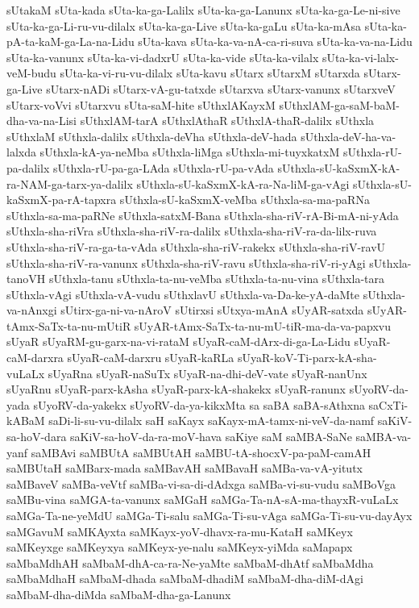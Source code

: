 {sUtakaM
sUta-kada
sUta-ka-ga-Lalilx
sUta-ka-ga-Lanunx
sUta-ka-ga-Le-ni-sive
sUta-ka-ga-Li-ru-vu-dilalx
sUta-ka-ga-Live
sUta-ka-gaLu
sUta-ka-mAsa
sUta-ka-pA-ta-kaM-ga-La-na-Lidu
sUta-kava
sUta-ka-va-nA-ca-ri-suva
sUta-ka-va-na-Lidu
sUta-ka-vanunx
sUta-ka-vi-dadxrU
sUta-ka-vide
sUta-ka-vilalx
sUta-ka-vi-lalx-veM-budu
sUta-ka-vi-ru-vu-dilalx
sUta-kavu
sUtarx
sUtarxM
sUtarxda
sUtarx-ga-Live
sUtarx-nADi
sUtarx-vA-gu-tatxde
sUtarxva
sUtarx-vanunx
sUtarxveV
sUtarx-voVvi
sUtarxvu
sUta-saM-hite
sUthxlAKayxM
sUthxlAM-ga-saM-baM-dha-va-na-Lisi
sUthxlAM-tarA
sUthxlAthaR
sUthxlA-thaR-dalilx
sUthxla
sUthxlaM
sUthxla-dalilx
sUthxla-deVha
sUthxla-deV-hada
sUthxla-deV-ha-va-lalxda
sUthxla-kA-ya-neMba
sUthxla-liMga
sUthxla-mi-tuyxkatxM
sUthxla-rU-pa-dalilx
sUthxla-rU-pa-ga-LAda
sUthxla-rU-pa-vAda
sUthxla-sU-kaSxmX-kA-ra-NAM-ga-tarx-ya-dalilx
sUthxla-sU-kaSxmX-kA-ra-Na-liM-ga-vAgi
sUthxla-sU-kaSxmX-pa-rA-tapxra
sUthxla-sU-kaSxmX-veMba
sUthxla-sa-ma-paRNa
sUthxla-sa-ma-paRNe
sUthxla-satxM-Bana
sUthxla-sha-riV-rA-Bi-mA-ni-yAda
sUthxla-sha-riVra
sUthxla-sha-riV-ra-dalilx
sUthxla-sha-riV-ra-da-lilx-ruva
sUthxla-sha-riV-ra-ga-ta-vAda
sUthxla-sha-riV-rakekx
sUthxla-sha-riV-ravU
sUthxla-sha-riV-ra-vanunx
sUthxla-sha-riV-ravu
sUthxla-sha-riV-ri-yAgi
sUthxla-tanoVH
sUthxla-tanu
sUthxla-ta-nu-veMba
sUthxla-ta-nu-vina
sUthxla-tara
sUthxla-vAgi
sUthxla-vA-vudu
sUthxlavU
sUthxla-va-Da-ke-yA-daMte
sUthxla-va-nAnxgi
sUtirx-ga-ni-va-nAroV
sUtirxsi
sUtxya-mAnA
sUyAR-satxda
sUyAR-tAmx-SaTx-ta-nu-mUtiR
sUyAR-tAmx-SaTx-ta-nu-mU-tiR-ma-da-va-papxvu
sUyaR
sUyaRM-gu-garx-na-vi-rataM
sUyaR-caM-dArx-di-ga-La-Lidu
sUyaR-caM-darxra
sUyaR-caM-darxru
sUyaR-kaRLa
sUyaR-koV-Ti-parx-kA-sha-vuLaLx
sUyaRna
sUyaR-naSuTx
sUyaR-na-dhi-deV-vate
sUyaR-nanUnx
sUyaRnu
sUyaR-parx-kAsha
sUyaR-parx-kA-shakekx
sUyaR-ranunx
sUyoRV-da-yada
sUyoRV-da-yakekx
sUyoRV-da-ya-kikxMta
sa
saBA
saBA-sAthxna
saCxTi-kABaM
saDi-li-su-vu-dilalx
saH
saKayx
saKayx-mA-tamx-ni-veV-da-namf
saKiV-sa-hoV-dara
saKiV-sa-hoV-da-ra-moV-hava
saKiye
saM
saMBA-SaNe
saMBA-va-yanf
saMBAvi
saMBUtA
saMBUtAH
saMBU-tA-shocxV-pa-paM-camAH
saMBUtaH
saMBarx-mada
saMBavAH
saMBavaH
saMBa-va-vA-yitutx
saMBaveV
saMBa-veVtf
saMBa-vi-sa-di-dAdxga
saMBa-vi-su-vudu
saMBoVga
saMBu-vina
saMGA-ta-vanunx
saMGaH
saMGa-Ta-nA-sA-ma-thayxR-vuLaLx
saMGa-Ta-ne-yeMdU
saMGa-Ti-salu
saMGa-Ti-su-vAga
saMGa-Ti-su-vu-dayAyx
saMGavuM
saMKAyxta
saMKayx-yoV-dhavx-ra-mu-KataH
saMKeyx
saMKeyxge
saMKeyxya
saMKeyx-ye-nalu
saMKeyx-yiMda
saMapapx
saMbaMdhAH
saMbaM-dhA-ca-ra-Ne-yaMte
saMbaM-dhAtf
saMbaMdha
saMbaMdhaH
saMbaM-dhada
saMbaM-dhadiM
saMbaM-dha-diM-dAgi
saMbaM-dha-diMda
saMbaM-dha-ga-Lanunx
}
